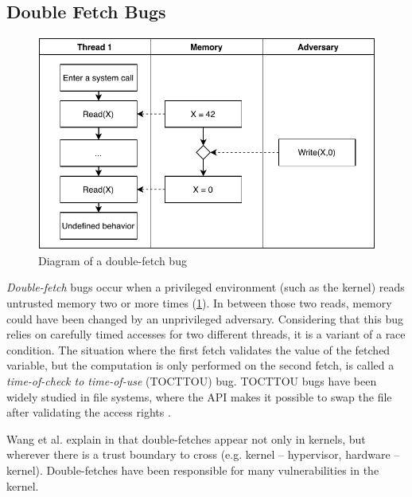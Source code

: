 \subsection{Double Fetch Bugs}
\label{subsec:doublefetch}

\begin{figure}[]
  \centering
  \includegraphics[width=.85\linewidth]{img/doublefetch.pdf}
  \caption{Diagram of a double-fetch bug}
  \label{fig:doublefetch}
\end{figure}

\emph{Double-fetch} bugs occur when a privileged environment (such as the 
kernel) reads untrusted memory two or more times (\cref{fig:doublefetch}). 
In between those two reads, memory could have been changed by an unprivileged
adversary. Considering that this bug relies on carefully timed accesses
for two different threads, it is a variant of a race condition. The situation
where the first fetch validates the value of the fetched variable, 
but the computation is only performed on the second fetch, is called a 
\emph{time-of-check to time-of-use} (TOCTTOU) bug. TOCTTOU bugs have been
widely studied in file systems, where the API makes it possible to swap the file
after validating the access rights \cite{payer2012protecting,
pu2006methodical, wei2010modeling, tsafrir2008portably}.


Wang et al. explain in \cite{wang2018survey} that double-fetches appear not only
in kernels, but wherever there is a trust boundary to cross (e.g. kernel -- 
hypervisor, hardware -- kernel). Double-fetches have been responsible for many
vulnerabilities in the kernel.

